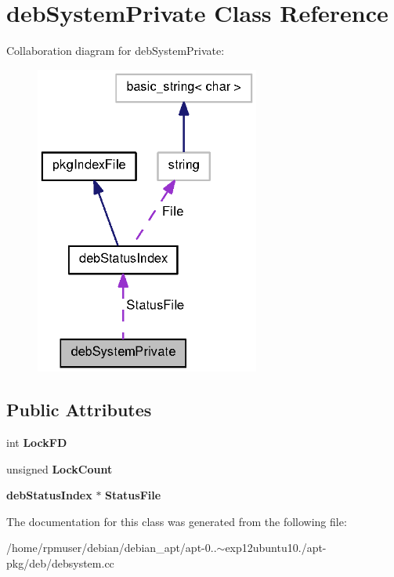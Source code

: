 \section{deb\-System\-Private \-Class \-Reference}
\label{classdebSystemPrivate}


\-Collaboration diagram for deb\-System\-Private\-:
\nopagebreak
\begin{figure}[H]
\begin{center}
\leavevmode
\includegraphics[width=209pt]{classdebSystemPrivate__coll__graph}
\end{center}
\end{figure}
\subsection*{\-Public \-Attributes}
\begin{DoxyCompactItemize}
\item 
int {\bfseries \-Lock\-F\-D}\label{classdebSystemPrivate_a96d2c013114049359ea86a124cfb0ab3}

\item 
unsigned {\bfseries \-Lock\-Count}\label{classdebSystemPrivate_a4ba1848c40aefd9b54adca2575810756}

\item 
{\bf deb\-Status\-Index} $\ast$ {\bfseries \-Status\-File}\label{classdebSystemPrivate_a7bba5521d130606ed917a004e468fbae}

\end{DoxyCompactItemize}


\-The documentation for this class was generated from the following file\-:\begin{DoxyCompactItemize}
\item 
/home/rpmuser/debian/debian\-\_\-apt/apt-\/0..$\sim$exp12ubuntu10./apt-\/pkg/deb/debsystem.\-cc\end{DoxyCompactItemize}
